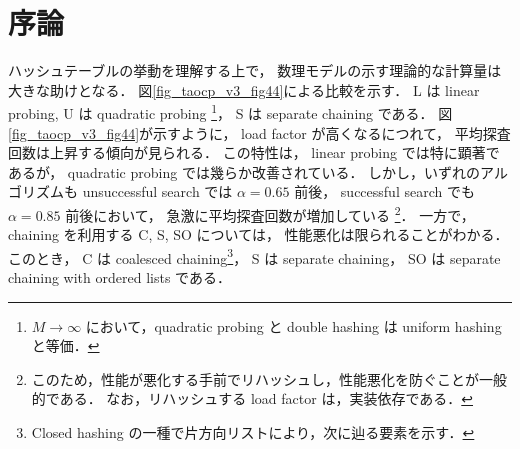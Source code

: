 \chapter{序論}
\label{chap_Introduction}

ハッシュテーブルの挙動を理解する上で，
数理モデルの示す理論的な計算量は大きな助けとなる．
図\ref{fig_taocp_v3_fig44}に\cite{knuth1998}よる比較を示す．
L は linear probing,
U は quadratic probing \footnote{$M \rightarrow \infty$ において，quadratic probing と double hashing は uniform hashing と等価．}，
S は separate chaining である．
図\ref{fig_taocp_v3_fig44}が示すように，
load factor が高くなるにつれて，
平均探査回数は上昇する傾向が見られる．
この特性は，
linear probing では特に顕著であるが，
quadratic probing では幾らか改善されている．
しかし，いずれのアルゴリズムも
unsuccessful search では $\alpha = 0.65$ 前後，
successful search でも $\alpha = 0.85$ 前後において，
急激に平均探査回数が増加している
\footnote{
  このため，性能が悪化する手前でリハッシュし，性能悪化を防ぐことが一般的である．
  なお，リハッシュする load factor は，実装依存である．
}．
一方で，chaining を利用する C, S, SO については，
性能悪化は限られることがわかる．
このとき，
C は coalesced chaining\footnote{Closed hashing の一種で片方向リストにより，次に辿る要素を示す．}，
S は separate chaining，
SO は separate chaining with ordered lists である．




